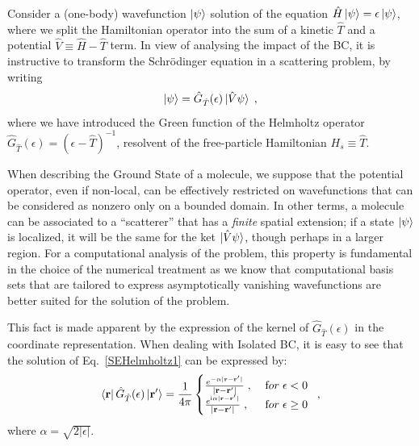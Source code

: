 \documentclass[reprint,aps,prb]{revtex4-1}
\renewcommand{\r}{{\bf r}}
\newcommand{\eps}{\epsilon}
\newcommand{\ii}{\mathrm{i}}
\newcommand{\be}{\begin{equation}}
\newcommand{\ee}{\end{equation}}
\newcommand{\lb}{\label}
\newcommand{\op}[1]{\hat {#1}}
\newcommand{\GH}{\op G_{\op T}}
\begin{document}

Consider a (one-body) wavefunction $\ket{\psi}$ solution of the equation
$\op H\ket{\psi}=\eps\ket{\psi}$, where we split the Hamiltonian operator into the sum of
a kinetic $\op T$ and a potential $\op V \equiv \op H - \op T$ term.
In view of analysing the impact of the BC, it is instructive to transform
the Schr\"odinger equation in a scattering problem, by writing
\be\lb{SEHelmholtz1}
\ket{\psi} = \GH(\eps)\ket{\op V\psi}\;,
\ee
where we have introduced the Green function of the Helmholtz operator $\GH(\eps) = (\eps-\op T)^{-1}$,
resolvent of the free-particle Hamiltonian $H_s \equiv \op T$.

When describing the Ground State of a molecule, we suppose that the potential operator, even if non-local,
can be effectively restricted on wavefunctions that can be considered as nonzero only on a
bounded domain. In other terms, a molecule can be associated to a ``scatterer'' that has a \emph{finite}
spatial extension; if a state $\ket{\psi}$ is localized, it will be the same for the ket $\ket{\op V \psi}$, though
perhaps in a larger region.
For a computational analysis of the problem, this property is fundamental in the choice of the numerical treatment as we know that
computational basis sets
that are tailored to express asymptotically vanishing wavefunctions are better suited for the solution of the problem.

This fact is made apparent by the expression of
the kernel of $\GH(\eps)$ in the coordinate representation.
When dealing with Isolated BC, it is easy to see that the solution of Eq.~\eqref{SEHelmholtz1}
can be expressed by:
\be\lb{HelmholtzKernelDef1}
\bra{\r} \GH(\eps) \ket{\r'} = \frac{1}{4\pi} \begin{cases}
\frac{e^{-\alpha|\r - \r' |}}{|\r- \r' |} \;,\; & {\textrm for}\; \eps  < 0\; \\
\frac{e^{\ii \alpha |\r-\r' |}}{|\r-\r' |} \;, & {\textrm for} \; \eps \geq 0
\end{cases} \;,
\ee
where $\alpha = \sqrt{2|\eps|}$.
\end{document}
